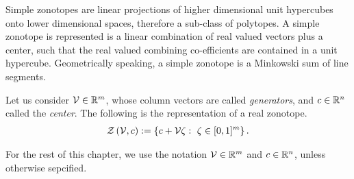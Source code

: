 
Simple zonotopes are linear
projections of higher dimensional unit hypercubes onto lower
dimensional spaces, therefore a sub-class of polytopes.  A simple
zonotope is represented is a linear combination of real valued vectors
plus a center, such that the real valued combining co-efficients are
contained in a unit hypercube.  Geometrically speaking, a simple
zonotope is a Minkowski sum of line segments.
%
\begin{definition}
Let us consider $\mathcal{V}\in\mathbb{R}^m$, whose column vectors are called
\emph{generators}, and $c\in\mathbb{R}^n$ called the \emph{center}.  The following is the
representation of a real zonotope.
%
\begin{align*}
\mathit{\mathcal{Z}}\left(\mathcal{V},c\right):=\left\{c+\mathcal{V}\zeta:~\zeta\in[0,1]^m\right\}.
\end{align*}
%
\end{definition}
%
For the rest of this chapter, we
use the notation $\mathcal{V}\in\mathbb{R}^m$ and $c\in\mathbb{R}^n$, unless
otherwise sepcified.

